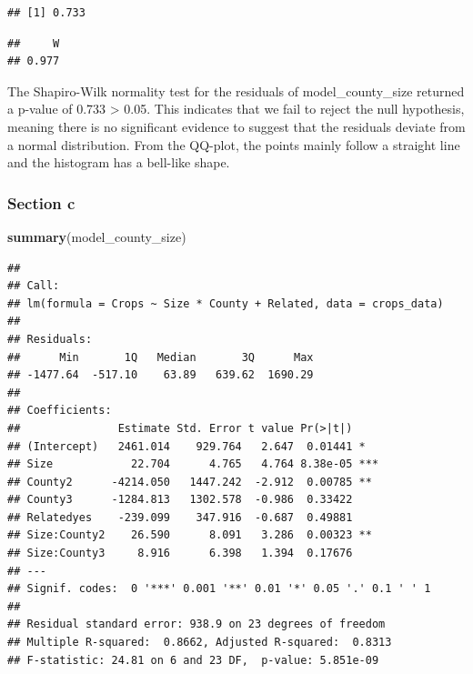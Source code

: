 \documentclass[
  11pt,
]{article}
\newenvironment{Shaded}{\begin{snugshade}}{\end{snugshade}}
\newcommand{\DecValTok}[1]{\textcolor[rgb]{0.00,0.00,0.81}{#1}}
\newcommand{\FunctionTok}[1]{\textcolor[rgb]{0.13,0.29,0.53}{\textbf{#1}}}
\newcommand{\NormalTok}[1]{#1}
\newcommand{\SpecialCharTok}[1]{\textcolor[rgb]{0.81,0.36,0.00}{\textbf{#1}}}
\begin{document}
\begin{verbatim}
## [1] 0.733
\end{verbatim}

\begin{Shaded}
\end{Shaded}

\begin{verbatim}
##     W 
## 0.977
\end{verbatim}

The Shapiro-Wilk normality test for the residuals of model\_county\_size
returned a p-value of 0.733 \textgreater{} 0.05. This indicates that we
fail to reject the null hypothesis, meaning there is no significant
evidence to suggest that the residuals deviate from a normal
distribution. From the QQ-plot, the points mainly follow a straight line
and the histogram has a bell-like shape.

\subsubsection{Section c}\label{section-c-1}

\begin{Shaded}
\begin{Highlighting}[]
\FunctionTok{summary}\NormalTok{(model\_county\_size)}
\end{Highlighting}
\end{Shaded}

\begin{verbatim}
## 
## Call:
## lm(formula = Crops ~ Size * County + Related, data = crops_data)
## 
## Residuals:
##      Min       1Q   Median       3Q      Max 
## -1477.64  -517.10    63.89   639.62  1690.29 
## 
## Coefficients:
##               Estimate Std. Error t value Pr(>|t|)    
## (Intercept)   2461.014    929.764   2.647  0.01441 *  
## Size            22.704      4.765   4.764 8.38e-05 ***
## County2      -4214.050   1447.242  -2.912  0.00785 ** 
## County3      -1284.813   1302.578  -0.986  0.33422    
## Relatedyes    -239.099    347.916  -0.687  0.49881    
## Size:County2    26.590      8.091   3.286  0.00323 ** 
## Size:County3     8.916      6.398   1.394  0.17676    
## ---
## Signif. codes:  0 '***' 0.001 '**' 0.01 '*' 0.05 '.' 0.1 ' ' 1
## 
## Residual standard error: 938.9 on 23 degrees of freedom
## Multiple R-squared:  0.8662, Adjusted R-squared:  0.8313 
## F-statistic: 24.81 on 6 and 23 DF,  p-value: 5.851e-09
\end{verbatim}
\end{document}
